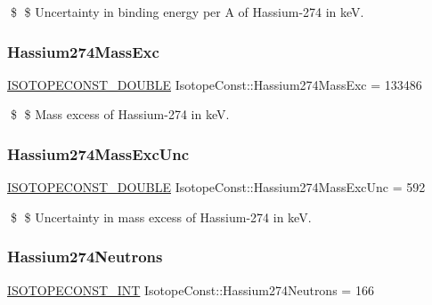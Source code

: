 \$ \$ Uncertainty in binding energy per A of Hassium-\/274 in keV. \mbox{\label{group___isotope_const-_hassium-_hs274_ga611ad32bcb46dadd7f387ca2aa13018e}} 
\subsubsection{\texorpdfstring{Hassium274\+Mass\+Exc}{Hassium274MassExc}}
{\footnotesize\ttfamily \mbox{\hyperlink{group___isotope_const-_macros_ga8f45a7272ce02c0b4c65c44636ed719a}{I\+S\+O\+T\+O\+P\+E\+C\+O\+N\+S\+T\+\_\+\+D\+O\+U\+B\+LE}} Isotope\+Const\+::\+Hassium274\+Mass\+Exc = 133486}

\$ \$ Mass excess of Hassium-\/274 in keV. \mbox{\label{group___isotope_const-_hassium-_hs274_gae74e0cf5d91b2c8ff6c810080642b3b1}} 
\subsubsection{\texorpdfstring{Hassium274\+Mass\+Exc\+Unc}{Hassium274MassExcUnc}}
{\footnotesize\ttfamily \mbox{\hyperlink{group___isotope_const-_macros_ga8f45a7272ce02c0b4c65c44636ed719a}{I\+S\+O\+T\+O\+P\+E\+C\+O\+N\+S\+T\+\_\+\+D\+O\+U\+B\+LE}} Isotope\+Const\+::\+Hassium274\+Mass\+Exc\+Unc = 592}

\$ \$ Uncertainty in mass excess of Hassium-\/274 in keV. \mbox{\label{group___isotope_const-_hassium-_hs274_ga03bd26f90c0fb920345228123c721f57}} 
\subsubsection{\texorpdfstring{Hassium274\+Neutrons}{Hassium274Neutrons}}
{\footnotesize\ttfamily \mbox{\hyperlink{group___isotope_const-_macros_ga5f18360b3e99483a35c32d789e62621c}{I\+S\+O\+T\+O\+P\+E\+C\+O\+N\+S\+T\+\_\+\+I\+NT}} Isotope\+Const\+::\+Hassium274\+Neutrons = 166}

